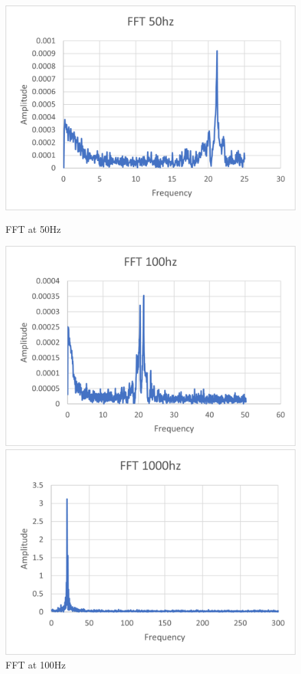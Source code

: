 \documentclass{article}
\begin{document}
\begin{figure}[H]
\begin{minipage}{.5\textwidth}
    \end{minipage}
    \begin{minipage}{.5\textwidth}
      \centering
      \includegraphics[width=.95\linewidth]{lab5images/FFT50hz.png}
      \caption{FFT at 50Hz}
      \label{fig:fft50hz}
    \end{minipage}%
    \begin{minipage}{.5\textwidth}
      \centering
      \includegraphics[width=.95\linewidth]{lab5images/FFT100hz.png}
      \caption{FFT at 100Hz}
      \label{fig:fft100hz}
    \end{minipage}
    \begin{minipage}{.5\textwidth}
      \centering
      \includegraphics[width=.95\linewidth]{lab5images/FFT1000hz.png}

\end{minipage}
\end{figure}
\end{document}
